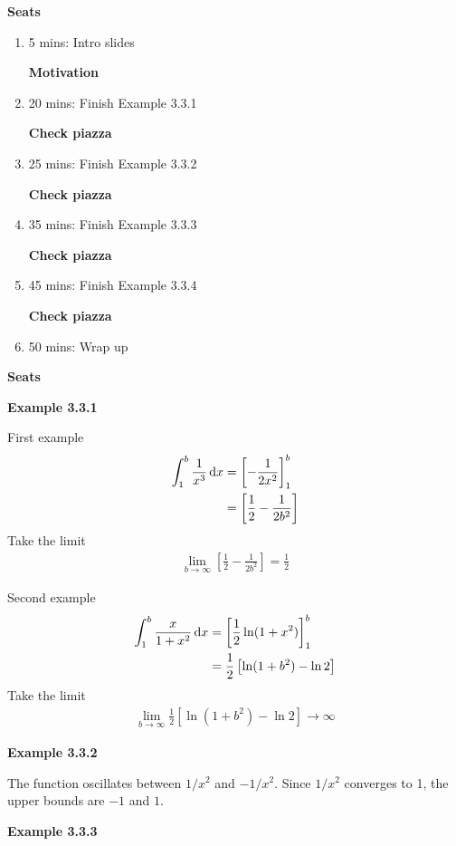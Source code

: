 \textbf{Seats}
\begin{enumerate}
    \item 5 mins: Intro slides \par
    \textbf{Motivation}
    \item 20 mins: Finish Example 3.3.1 \par
    \textbf{Check piazza}
    \item 25 mins: Finish Example 3.3.2 \par
    \textbf{Check piazza}
    \item 35 mins: Finish Example 3.3.3 \par
    \textbf{Check piazza}
    \item 45 mins: Finish Example 3.3.4 \par
    \textbf{Check piazza}
    \item 50 mins: Wrap up \par
\end{enumerate}
\textbf{Seats}

\vspace{10mm}
\textbf{Example 3.3.1}

First example
\begin{align*}
   \int_1^b \frac{1}{x^3} \, {\rm d}x &= \left[-\frac{1}{2x^2}\right]_1^b \\
   &= \left[\frac{1}{2} - \frac{1}{2b^2}\right]
\end{align*}
Take the limit
\begin{align*}
    \lim_{b\rightarrow\infty} \left[\frac{1}{2} - \frac{1}{2b^2}\right] = \frac{1}{2}
\end{align*}

Second example
\begin{align*}
    \int_1^b \frac{x}{1+x^2} \, {\rm d}x &= \left[\frac{1}{2} \ln(1+x^2) \right]_1^b\\
    &= \frac{1}{2}\left[\ln(1+b^2)-\ln 2 \right]
\end{align*}
Take the limit
\begin{align*}
    \lim_{b\rightarrow\infty} \frac{1}{2}\left[\ln(1+b^2)-\ln 2 \right] \rightarrow \infty
\end{align*}

\vspace{10mm}
\textbf{Example 3.3.2}

The function oscillates between $1/x^2$ and $-1/x^2$. Since $1/x^2$ converges to 1, the upper bounds are $-1$ and $1$.

\vspace{10mm}
\textbf{Example 3.3.3}

